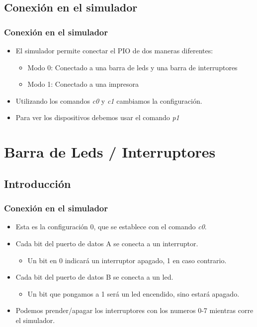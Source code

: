 \documentclass{beamer}
\begin{document}
\subsection{Conexión en el simulador}
\begin{frame}
\frametitle{Conexión en el simulador}
\begin{itemize}
  \item El simulador permite conectar el PIO de dos maneras diferentes:
  \begin{itemize}
    \item Modo 0: Conectado a una barra de leds y una barra de interruptores
    \item Modo 1: Conectado a una impresora
  \end{itemize}
  \item Utilizando los comandos \emph{c0} y \emph{c1} cambiamos la configuración.
  \item Para ver los dispositivos debemos usar el comando \emph{p1}
\end{itemize}
\end{frame}

\section{Barra de Leds / Interruptores}
\subsection{Introducción}
\begin{frame}
\frametitle{Conexión en el simulador}
\begin{itemize}
  \item Esta es la configuración 0, que se establece con el comando \emph{c0}.
  \item Cada bit del puerto de datos A se conecta a un interruptor.
  \begin{itemize}
      \item Un bit en 0 indicará un interruptor apagado, 1 en caso contrario.
\end{itemize}
  \item Cada bit del puerto de datos B se conecta a un led.
\begin{itemize}
      \item Un bit que pongamos a 1 será un led encendido, sino estará apagado.
\end{itemize}
  \item Podemos prender/apagar los interruptores con los numeros 0-7 mientras corre el simulador.
\end{itemize}
\end{frame}
\end{document}
